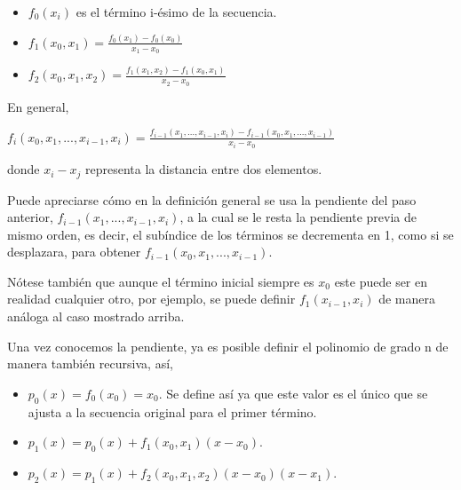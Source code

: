 \begin{itemize}
  \item $f_{0}(x_{i})$ es el t\'ermino i-\'esimo de la secuencia. 
  \item $\displaystyle{f_{1}(x_{0},x_{1}) = \frac{f_{0}(x_{1})-f_{0}(x_{0})}{x_{1}-x_{0}}}$
  \item $\displaystyle{f_{2}(x_{0},x_{1},x_{2}) = \frac{f_{1}(x_{1},x_{2})-f_{1}(x_{0},x_{1})}{x_{2}-x_{0}}}$
\end{itemize}

\hspace{0.4cm} En general,

\begin{center}
$\displaystyle{f_{i}(x_{0},x_{1},...,x_{i-1},x_{i}) = \frac{f_{i-1}(x_{1},...,x_{i-1},x_{i})-f_{i-1}(x_{0},x_{1},...,x_{i-1} )}{x_{i}-x_{0}}}$
\end{center}


\noindent donde  $\displaystyle{x_{i}-x_{j}}$ representa la distancia entre dos elementos.

\hspace{0.4cm} Puede apreciarse c\'omo en la definici\'on general se usa la pendiente del paso anterior, $f_{i-1}(x_{1},...,x_{i-1},x_{i})$, a la cual se le resta la pendiente previa de mismo orden, es decir, el sub\'indice de los t\'erminos se decrementa en 1, como si se desplazara, para obtener $f_{i-1}(x_{0},x_{1},...,x_{i-1})$.

\hspace{0.4cm} N\'otese tambi\'en que aunque el t\'ermino inicial siempre es $x_{0}$ este puede ser en realidad cualquier otro, por ejemplo, se puede definir $f_{1}(x_{i-1},x_{i})$ de manera an\'aloga al caso mostrado arriba.

\hspace{0.4cm} Una vez conocemos la pendiente, ya es posible definir el polinomio de grado n de manera tambi\'en recursiva, as\'i,

\begin{itemize}
  \item $p_{0}(x) = f_{0} (x_{0}) =x_{0}$.  Se define as\'i ya que este valor es el \'unico que se ajusta a la secuencia original para el primer t\'ermino. 
  \item $\displaystyle{p_{1}(x) = p_{0}(x) +  f_{1} (x_{0},x_{1}) (x-x_{0})}$.
  \item $\displaystyle{p_{2}(x) = p_{1}(x) +  f_{2} (x_{0},x_{1},x_{2}) (x-x_{0})(x-x_{1})}$.
\end{itemize}

